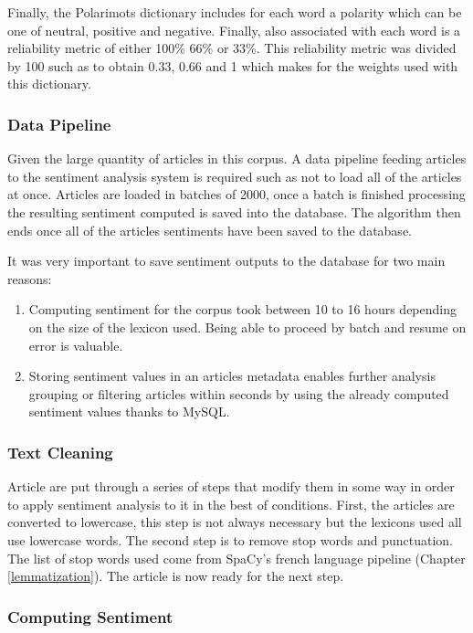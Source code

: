Finally, the Polarimots dictionary includes for each word a polarity which can be one of neutral, positive and negative. Finally, also associated with each word is a reliability metric of either 100\% 66\% or 33\%. This reliability metric was divided by 100 such as to obtain 0.33, 0.66 and 1 which makes for the weights used with this dictionary.

\subsubsection{Data Pipeline}

Given the large quantity of articles in this corpus. A data pipeline feeding articles to the sentiment analysis system is required such as not to load all of the articles at once. Articles are loaded in batches of 2000, once a batch is finished processing the resulting sentiment computed is saved into the database. The algorithm then ends once all of the articles sentiments have been saved to the database.

It was very important to save sentiment outputs to the database for two main reasons:
\begin{enumerate}
    \item Computing sentiment for the corpus took between 10 to 16 hours depending on the size of the lexicon used. Being able to proceed by batch and resume on error is valuable.
    \item Storing sentiment values in an articles metadata enables further analysis grouping or filtering articles within seconds by using the already computed sentiment values thanks to MySQL.
\end{enumerate}

\subsubsection{Text Cleaning}

Article are put through a series of steps that modify them in some way in order to apply sentiment analysis to it in the best of conditions. First, the articles are converted to lowercase, this step is not always necessary but the lexicons used all use lowercase words. The second step is to remove stop words and punctuation. The list of stop words used come from SpaCy's french language pipeline (Chapter \ref{lemmatization}). The article is now ready for the next step.

\subsubsection{Computing Sentiment}

